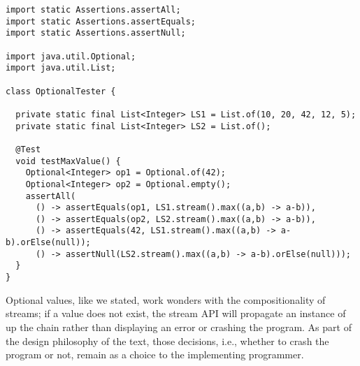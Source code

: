 \begin{lstlisting}[language=MyJava]
import static Assertions.assertAll;
import static Assertions.assertEquals;
import static Assertions.assertNull;

import java.util.Optional;
import java.util.List;

class OptionalTester {

  private static final List<Integer> LS1 = List.of(10, 20, 42, 12, 5);
  private static final List<Integer> LS2 = List.of();

  @Test
  void testMaxValue() {
    Optional<Integer> op1 = Optional.of(42);
    Optional<Integer> op2 = Optional.empty();
    assertAll(
      () -> assertEquals(op1, LS1.stream().max((a,b) -> a-b)),
      () -> assertEquals(op2, LS2.stream().max((a,b) -> a-b)),
      () -> assertEquals(42, LS1.stream().max((a,b) -> a-b).orElse(null));
      () -> assertNull(LS2.stream().max((a,b) -> a-b).orElse(null)));
  }
}
\end{lstlisting}

Optional values, like we stated, work wonders with the compositionality of streams; if a value does not exist, the stream API will propagate an  instance of  up the chain rather than displaying an error or crashing the program. 
As part of the design philosophy of the text, those decisions, i.e., whether to crash the program or not, remain as a choice to the implementing programmer.
